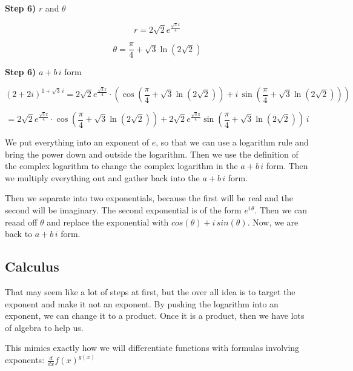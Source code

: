 \documentclass{ximera}
\begin{document}
\begin{procedure}
\textbf{\textcolor{blue!75!black}{Step 6)}}  $r$ and $\theta$ 



\[ r =  2\sqrt{2}  e^{\frac{\sqrt{3}\pi}{4}} \]

\[ \theta =  \frac{\pi}{4} + \sqrt{3} \ln(2\sqrt{2}) \]


\textbf{\textcolor{blue!75!black}{Step 6)}}  $a + b \, i$ form


\[
 (2+2i)^{1+\sqrt{3} \, i}   = 2\sqrt{2}  e^{\frac{\sqrt{3}\pi}{4}} \cdot \left( \cos\left( \frac{\pi}{4} + \sqrt{3} \ln(2\sqrt{2}) \right) + i \, \sin\left( \frac{\pi}{4} + \sqrt{3} \ln(2\sqrt{2}) \right) \right)
\]




\[
   = 2\sqrt{2}  e^{\frac{\sqrt{3}\pi}{4}} \cdot  \cos\left( \frac{\pi}{4} + \sqrt{3} \ln(2\sqrt{2}) \right) + 2\sqrt{2}  e^{\frac{\sqrt{3}\pi}{4}} \sin\left( \frac{\pi}{4} + \sqrt{3} \ln(2\sqrt{2}) \right) \, i
\]

\end{procedure}



We put everything into an exponent of $e$, so that we can use a logarithm rule and bring the power down and outside the logarithm.  Then we use the definition of the complex logarithm to change the complex logarithm in the $a + b \, i$ form. Then we multiply everything out and gather back into the $a + b \, i$ form. 

Then we separate into two exponentials, because the first will be real and the second will be imaginary. The second exponential is of the form $e^{i \, \theta}$.  Then we can reaad off $\theta$ and replace the exponential with $cos(\theta) + i \, sin(\theta)$.  Now, we are back to $a + b \, i$ form.




\subsection{Calculus}

That may seem like a lot of steps at first, but the over all idea is to target the exponent and make it not an exponent. By pushing the logarithm into an exponent, we can change it to a product.  Once it is a product, then we have lots of algebra to help us.

This mimics exactly how we will differentiate functions with formulas involving exponents:  $\frac{d}{dx} f(x)^{g(x)}$
\end{document}
